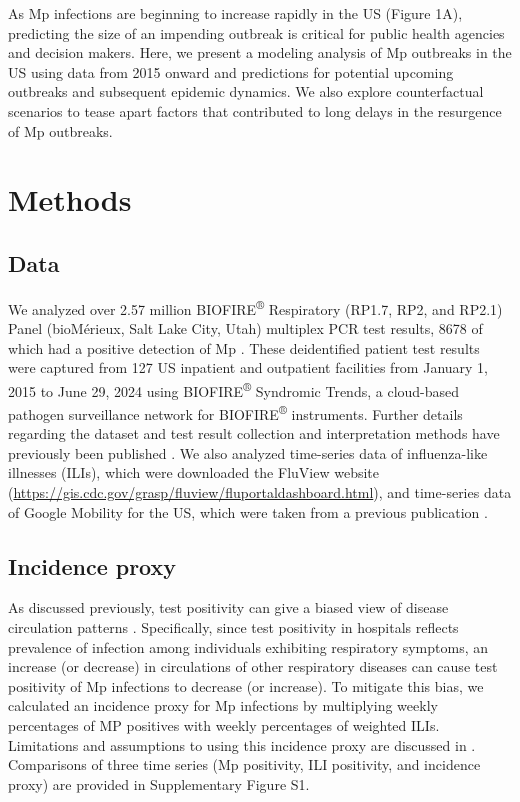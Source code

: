\documentclass[12pt]{article}
\begin{document}
As Mp infections are beginning to increase rapidly in the US (Figure 1A), predicting the size of an impending outbreak is critical for public health agencies and decision makers.
Here, we present a modeling analysis of Mp outbreaks in the US using data from 2015 onward and predictions for potential upcoming outbreaks and subsequent epidemic dynamics.
We also explore counterfactual scenarios to tease apart factors that contributed to long delays in the resurgence of Mp outbreaks.

\section{Methods}

\subsection{Data}

We analyzed over 2.57 million BIOFIRE\textsuperscript{®} Respiratory (RP1.7, RP2, and RP2.1) Panel (bioMérieux, Salt Lake City, Utah) multiplex PCR test results, 8678 of which had a positive detection of Mp \citep{poritz2011filmarray,leber2018multicenter,creager2020clinical}. 
These deidentified patient test results were captured from 127 US inpatient and outpatient facilities from January 1, 2015 to June 29, 2024 using BIOFIRE\textsuperscript{®} Syndromic Trends, a cloud-based pathogen surveillance network for BIOFIRE\textsuperscript{®} instruments. Further details regarding the dataset and test result collection and interpretation methods have previously been published \citep{meyers2018automated}.
We also analyzed time-series data of influenza-like illnesses (ILIs), which were downloaded the FluView website (\url{https://gis.cdc.gov/grasp/fluview/fluportaldashboard.html}), and time-series data of Google Mobility for the US, which were taken from a previous publication \citep{park2024predicting}.

\subsection{Incidence proxy}

As discussed previously, test positivity can give a biased view of disease circulation patterns \citep{goldstein2011predicting,kissler2020projecting,park2024predicting}. 
Specifically, since test positivity in hospitals reflects prevalence of infection among individuals exhibiting respiratory symptoms, an increase (or decrease) in circulations of other respiratory diseases can cause test positivity of Mp infections to decrease (or increase).
To mitigate this bias, we calculated an incidence proxy for Mp infections by multiplying weekly percentages of MP positives with weekly percentages of weighted ILIs.
Limitations and assumptions to using this incidence proxy are discussed in \cite{goldstein2011predicting}.
Comparisons of three time series (Mp positivity, ILI positivity, and incidence proxy) are provided in Supplementary Figure S1. 
\end{document}
